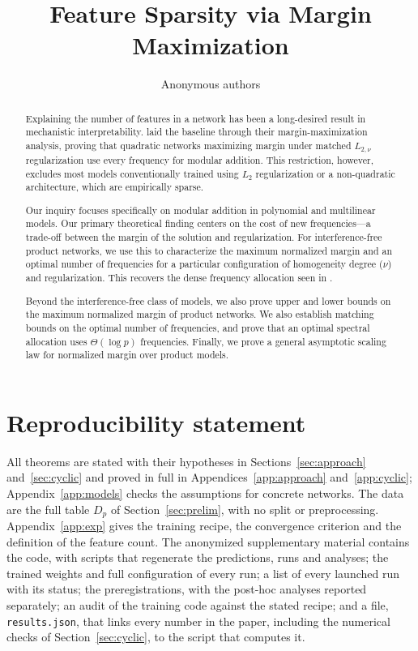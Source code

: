 \documentclass{article} %
\title{Feature Sparsity via Margin Maximization}
\author{Anonymous authors}
\theoremstyle{definition}
\theoremstyle{remark}
\begin{document}
\maketitle

\begin{abstract}
Explaining the number of features in a network has been a long-desired result in mechanistic interpretability. \citet{morwani2024feature} laid the baseline through their margin-maximization analysis, proving that quadratic networks maximizing margin under matched $L_{2,\nu}$ regularization use every frequency for modular addition. This restriction, however, excludes most models conventionally trained using $L_2$ regularization or a non-quadratic architecture, which are empirically sparse.

Our inquiry focuses specifically on modular addition in polynomial and multilinear models. Our primary theoretical finding centers on the cost of new frequencies---a trade-off between the margin of the solution and regularization. For interference-free product networks, we use this to characterize the maximum normalized margin and an optimal number of frequencies for a particular configuration of homogeneity degree ($\nu$) and regularization. This recovers the dense frequency allocation seen in \citet{morwani2024feature}.

Beyond the interference-free class of models, we also prove upper and lower bounds on the maximum normalized margin of product networks. We also establish matching bounds on the optimal number of frequencies, and prove that an optimal spectral allocation uses $\Theta(\log p)$ frequencies. Finally, we prove a general asymptotic scaling law for normalized margin over product models.
\end{abstract}





%  



\clearpage


\section*{Reproducibility statement}
All theorems are stated with their hypotheses in Sections~\ref{sec:approach} and~\ref{sec:cyclic} and proved in full in Appendices~\ref{app:approach} and~\ref{app:cyclic}; Appendix~\ref{app:models} checks the assumptions for concrete networks. The data are the full table $D_p$ of Section~\ref{sec:prelim}, with no split or preprocessing. Appendix~\ref{app:exp} gives the training recipe, the convergence criterion and the definition of the feature count. The anonymized supplementary material contains the code, with scripts that regenerate the predictions, runs and analyses; the trained weights and full configuration of every run; a list of every launched run with its status; the preregistrations, with the post-hoc analyses reported separately; an audit of the training code against the stated recipe; and a file, \texttt{results.json}, that links every number in the paper, including the numerical checks of Section~\ref{sec:cyclic}, to the script that computes it.
\end{document}
